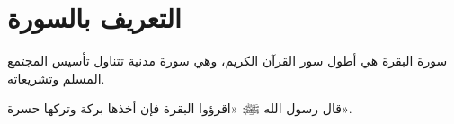 
\section{التعريف بالسورة}

سورة البقرة هي أطول سور القرآن الكريم، وهي سورة مدنية تتناول تأسيس المجتمع المسلم وتشريعاته.

\begin{notebox}
قال رسول الله ﷺ: «اقرؤوا البقرة فإن أخذها بركة وتركها حسرة».
\end{notebox}
